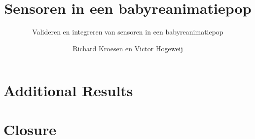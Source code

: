 \documentclass{layout/tudelft-report}
\begin{document}
    \frontmatter

    \title{Sensoren in een babyreanimatiepop}
    \subtitle{Valideren en integreren van sensoren in een babyreanimatiepop}
    \author{Richard Kroesen en Victor Hogeweij}
    \subject{Project Report}

    \makecover
    \afterpage{\blankpage}
    
    
    
    

    
    
    \tableofcontents    
    \printnomenclature
    \listoffigures
    \listoftables

    \mainmatter
    
    

    \epigraphhead[650]{}
  
    
    
    

    \epigraphhead[650]{}
    \part{Additional Results}
    \label{part:additional}
    
    
    

    \epigraphhead[650]{}
    \part{Closure}
    \label{part:closure}

    
    

    \printbibliography[title=References]
    
    \appendix
    
    
\end{document}
